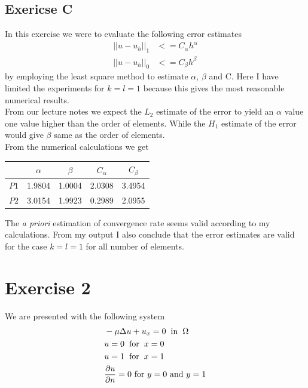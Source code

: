 \documentclass[a4paper,norsk]{article}
\begin{document}
\subsection*{Exericse C}
In this exercise we were to evaluate the following error estimates
\begin{align*}
||u - u_h||_1 &<= C_{\alpha}h^{\alpha} \\
||u - u_h||_0 &<= C_{\beta}h^{\beta}
\end{align*}
by employing the least square method to estimate $\alpha$, $\beta$ and C. Here I have limited the experiments
for $k = l = 1$ because this gives the most reasonable numerical results. \\

From our lecture notes we expect the $L_2$ estimate of the error to yield
an $\alpha$ value one value higher than the order of elements. While the $H_1$ estimate of the error
would give $\beta$ same as the order of elements. \\
From the numerical calculations we get

\begin{center}
\begin{tabular}{ ||c c c c c|| }
    \hline
& $\alpha$ & $\beta$ & $C_{\alpha}$ & $C_{\beta}$ \\
\hline\hline
$P1$ & 1.9804  & 1.0004 & 2.0308 & 3.4954  \\
\hline
$P2$ & 3.0154 & 1.9923 & 0.2989 & 2.0955 \\
\hline
\end{tabular}
\end{center}

The \textit{a priori} estimation of convergence rate seems valid according to my calculations.
From my output I also conclude that the error estimates are valid for the case $k=l=1$
for all number of elements.


\section*{Exercise 2}
We are presented with the following system
\begin{align}
&-\mu \Delta u + u_x= 0 \hspace{2mm} \text{in} \hspace{2mm} \Omega \\
&u = 0 \hspace{2mm} \text{for} \hspace{2mm} x = 0 \\
&u = 1 \hspace{2mm} \text{for} \hspace{2mm} x = 1 \\
&\frac{\partial u}{\partial n} = 0 \text{ for } y = 0 \text{ and } y = 1
\end{align}
\end{document}
